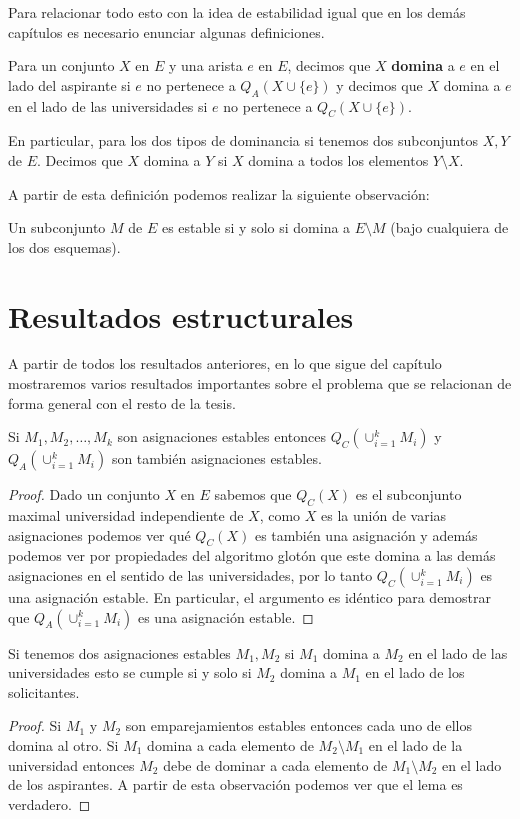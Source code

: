 Para relacionar todo esto con la idea de estabilidad igual que en los demás capítulos es necesario enunciar algunas definiciones.

\begin{dfn}
Para un conjunto $X$ en $E$ y una arista $e$ en $E$, decimos que $X$ \textbf{domina} a $e$ en el lado del aspirante si $e$ no pertenece a $Q_A(X \cup \{e\})$ y decimos que $X$ domina a $e$ en el lado de las universidades si $e$ no pertenece a $Q_C(X \cup \{e\})$.

En particular, para los dos tipos de dominancia si tenemos dos subconjuntos $X,Y$ de $E$. Decimos que $X$ domina a $Y$ si $X$ domina a todos los elementos $Y \setminus X$.
\end{dfn}

A partir de esta definición podemos realizar la siguiente observación:

\begin{obs}
Un subconjunto $M$ de $E$ es estable si y solo si domina a $E\setminus M$ (bajo cualquiera de los dos esquemas).
\end{obs}

\section{Resultados estructurales}

A partir de todos los resultados anteriores, en lo que sigue del capítulo mostraremos varios resultados importantes sobre el problema que se relacionan de forma general con el resto de la tesis. 

\begin{teo}
\label{union de estables}
Si $M_1,M_2,\dots,M_k$ son asignaciones estables entonces $Q_C( \cup_{i=1}^k M_i)$ y $Q_A( \cup_{i=1}^k M_i)$ son también asignaciones estables. 
\end{teo}
\begin{proof}
Dado un conjunto $X$ en $E$ sabemos que $Q_C(X)$ es el subconjunto maximal universidad independiente de $X$, como $X$ es la unión de varias asignaciones podemos ver qué $Q_C(X)$ es también una asignación y además podemos ver por propiedades del algoritmo glotón que este domina a las demás asignaciones en el sentido de las universidades, por lo tanto $Q_C( \cup_{i=1}^k M_i)$ es una asignación estable. En particular, el argumento es idéntico para demostrar que $Q_A( \cup_{i=1}^k M_i)$ es una asignación estable. 
\end{proof}

\begin{lem}
\label{desigualdad}
Si tenemos dos asignaciones estables $M_1,M_2$ si $M_1$ domina a $M_2$ en el lado de las universidades esto se cumple si y solo si $M_2$ domina a $M_1$ en el lado de los solicitantes.
\end{lem}
\begin{proof}
Si $M_1$ y $M_2$ son emparejamientos estables entonces cada uno de ellos domina al otro. Si $M_1$ domina a cada elemento de $M_2 \setminus M_1$ en el lado de la universidad entonces $M_2$ debe de dominar a cada elemento de $M_1 \setminus M_2$ en el lado de los aspirantes. A partir de esta observación podemos ver que el lema es verdadero.
\end{proof}

